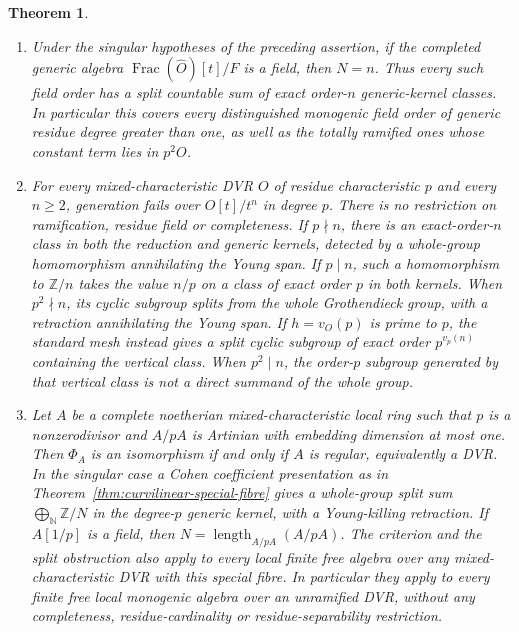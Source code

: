 \documentclass[11pt,a4paper]{article}
\newtheorem{theorem}{Theorem}[section]
\theoremstyle{definition}\newtheorem{definition}[theorem]{Definition}
\theoremstyle{remark}\newtheorem{remark}[theorem]{Remark}
\newcommand{\Z}{\mathbb Z}\newcommand{\Q}{\mathbb Q}
\begin{document}
\begin{theorem}
\begin{enumerate}[label=\textup{(\roman*)}]
This includes every prime, $N<n$, and nonreduced generic algebras.
\item Under the singular hypotheses of the preceding assertion,
if the completed generic algebra
$\operatorname{Frac}(\widehat O)[t]/F$ is a field, then
$N=n$.  Thus every such field order has a split countable sum of
exact order-$n$ generic-kernel classes.  In particular this covers
every distinguished monogenic field order of generic residue degree
greater than one, as well as the totally ramified ones whose
constant term lies in $p^2O$.
\item For every mixed-characteristic DVR $O$ of residue characteristic
$p$ and every $n\ge2$, generation fails over $O[t]/t^n$ in degree
$p$.  There is no restriction on ramification, residue field or
completeness.  If $p\nmid n$, there is an exact-order-$n$ class in
both the reduction and generic kernels, detected by a whole-group
homomorphism annihilating the Young span.  If $p\mid n$, such a
homomorphism to $\Z/n$ takes the value $n/p$ on a class of
exact order $p$ in both kernels.  When $p^2\nmid n$, its cyclic
subgroup splits from the whole Grothendieck group, with a retraction
annihilating the Young span.  If $h=v_O(p)$ is prime to $p$,
the standard mesh instead gives a split cyclic subgroup of exact
order $p^{v_p(n)}$ containing the vertical class.  When $p^2\mid n$,
the order-$p$ subgroup generated by that vertical class is not a
direct summand of the whole group.
\item Let $A$ be a complete noetherian mixed-characteristic local
ring such that $p$ is a nonzerodivisor and $A/pA$ is Artinian with
embedding dimension at most one.  Then $\Phi_A$ is an isomorphism
if and only if $A$ is regular, equivalently a DVR.  In the singular
case a Cohen coefficient presentation as in
Theorem~\ref{thm:curvilinear-special-fibre} gives a whole-group split
sum $\bigoplus_{\mathbb N}\Z/N$ in the degree-$p$ generic kernel,
with a Young-killing retraction.  If $A[1/p]$ is a field, then
$N=\operatorname{length}_{A/pA}(A/pA)$.
The criterion and the split obstruction also apply to every local
finite free algebra over any mixed-characteristic DVR with this
special fibre.  In particular they apply to every finite free local
monogenic algebra over an unramified DVR, without any completeness,
residue-cardinality or residue-separability restriction.
\end{enumerate}
\end{theorem}
\end{document}
